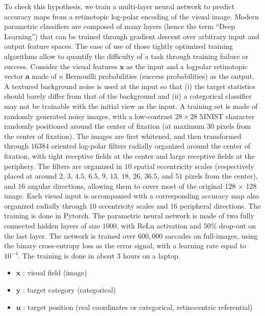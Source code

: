 \CNS
To check this hypothesis, we train a multi-layer neural network to predict accuracy maps from a retinotopic log-polar encoding of the visual image. Modern parametric classifiers are composed of many layers (hence the term ``Deep Learning'') that can be trained through gradient descent over arbitrary input and output feature spaces\CNS  {\bf [REF?]}\fi. The ease of use of those tightly optimized training algorithms allow to quantify the difficulty of a task through training failure or success. Consider the visual features  $\boldsymbol{x}$ as the input and a logpolar retinotopic vector $\boldsymbol{a}$ made of $n$ Bernouilli probabilities (success probabilities) as the output. A textured background noise is used at the input so that (i) the target statistics should barely differ from that of the background and (ii) a  categorical classifier may not be trainable with the initial view as the input. A training set is made of randomly generated noisy images, with a low-contrast $28\times 28$ MNIST character \CNS  {\bf [REF?]}\fi randomly positioned around the center of fixation (at maximum $30$ pixels from the center of fixation). The images are first whitened\CNS  {\bf [REF?]}\fi, and then transformed through $16384$ oriented log-polar filters radially organized around the center of fixation, with tight receptive fields at the center and large receptive fields at the periphery. The filters are organized in $10$ spatial eccentricity scales (respectively placed at around $2$, $3$, $4.5$, $6.5$, $9$, $13$, $18$, $26$, $36.5$, and $51$ pixels from the center), and $16$ angular directions, allowing them to cover most of the original 128 $\times$ 128 image. Each visual input is accompanied with a corresponding accuracy map also organized radially through $10$ eccentricity scales and $16$ peripheral directions. The training is done in Pytorch\CNS  {\bf [REF?]}\fi. The parametric neural network is made of two fully connected hidden layers of size $1000$, with ReLu activation and $50 \%$ drop-out on the last layer. The network is trained over $600,000$ saccades on full-images, using the binary cross-entropy loss as the error signal, with a learning rate equal to $10^{-4}$. The training is done in about 3 hours on a laptop.  


\fi



\CNS

\begin{itemize}
	\item $\boldsymbol{x}$ : visual field (image)
	\item $\boldsymbol{y}$ : target category (categorical)
	\item $\boldsymbol{u}$ : target position (real coordinates or categorical, retinocentric referential)

\end{itemize}

